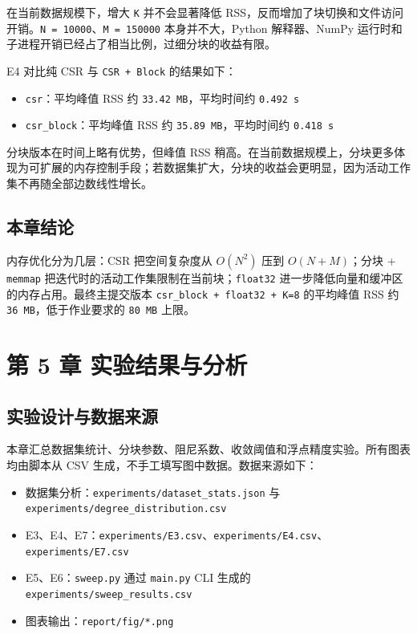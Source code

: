 \documentclass[UTF8,a4paper,12pt]{ctexart}
\begin{document}
在当前数据规模下，增大 \texttt{K} 并不会显著降低 RSS，反而增加了块切换和文件访问开销。\texttt{N = 10000}、\texttt{M = 150000} 本身并不大，Python 解释器、NumPy 运行时和子进程开销已经占了相当比例，过细分块的收益有限。


E4 对比纯 CSR 与 \texttt{CSR + Block} 的结果如下：


\begin{itemize}
\item \texttt{csr}：平均峰值 RSS 约 \texttt{33.42 MB}，平均时间约 \texttt{0.492 s}
\item \texttt{csr\_block}：平均峰值 RSS 约 \texttt{35.89 MB}，平均时间约 \texttt{0.418 s}
\end{itemize}


分块版本在时间上略有优势，但峰值 RSS 稍高。在当前数据规模上，分块更多体现为可扩展的内存控制手段；若数据集扩大，分块的收益会更明显，因为活动工作集不再随全部边数线性增长。


\subsection{本章结论}


内存优化分为几层：CSR 把空间复杂度从 $O(N^2)$ 压到 $O(N + M)$；分块 + \texttt{memmap} 把迭代时的活动工作集限制在当前块；\texttt{float32} 进一步降低向量和缓冲区的内存占用。最终主提交版本 \texttt{csr\_block + float32 + K=8} 的平均峰值 RSS 约 \texttt{36 MB}，低于作业要求的 \texttt{80 MB} 上限。

\section{第 5 章 实验结果与分析}


\subsection{实验设计与数据来源}


本章汇总数据集统计、分块参数、阻尼系数、收敛阈值和浮点精度实验。所有图表均由脚本从 CSV 生成，不手工填写图中数据。数据来源如下：


\begin{itemize}
\item 数据集分析：\texttt{experiments/dataset\_stats.json} 与 \texttt{experiments/degree\_distribution.csv}
\item E3、E4、E7：\texttt{experiments/E3.csv}、\texttt{experiments/E4.csv}、\texttt{experiments/E7.csv}
\item E5、E6：\texttt{sweep.py} 通过 \texttt{main.py} CLI 生成的 \texttt{experiments/sweep\_results.csv}
\item 图表输出：\texttt{report/fig/*.png}
\end{itemize}
\end{document}
